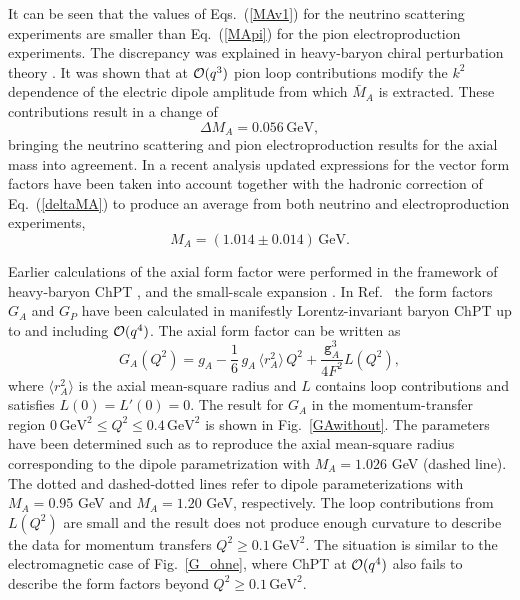 \documentclass[twoside,12pt]{article}
\begin{document}
   It can be seen that the values of Eqs.~(\ref{MAv1})
for the neutrino scattering experiments are smaller than Eq.~(\ref{MApi}) for
the pion electroproduction experiments.
   The discrepancy was explained in heavy-baryon chiral
perturbation theory \cite{Bernard:1992ys}.
   It was shown that at ${\cal O}(q^3)$ pion
loop contributions modify the $k^2$ dependence of the electric dipole amplitude
from which $\bar{M}_A$ is extracted.
   These contributions result in a change of
\begin{equation}\label{deltaMA}
    \Delta M_A = 0.056 \,\mbox{GeV},
\end{equation}
bringing the neutrino scattering and pion electroproduction
results for the axial mass into agreement.
     In a recent analysis \cite{Bodek:2007vi} updated expressions for the vector form
factors have been taken into account together with the hadronic correction
of Eq.~(\ref{deltaMA}) to produce an average from both neutrino and electroproduction
experiments,
\begin{equation}\label{MAv2}
    M_A = (1.014 \pm 0.014)\,\mbox{GeV}.
\end{equation}

  Earlier calculations of the axial form factor were performed in the framework of
heavy-baryon ChPT \cite{Bernard:1992ys}, \cite{Fearing:1997dp} and the small-scale
expansion \cite{Bernard:1998gv}.
   In Ref.\ \cite{Schindler:2006it} the form factors $G_A$ and
$G_P$ have been calculated in manifestly Lorentz-invariant baryon
ChPT up to and including ${\cal O}(q^4)$.
   The axial form factor can be written as
\begin{equation}\label{GAexpansion}
    G_A(Q^2)=g_A-\frac{1}{6}\,g_A\,\langle r^2_A\rangle\, Q^2 +
    \frac{\texttt{g}_A^3}{4F^2}L(Q^2),
\end{equation}
where $\langle r^2_A\rangle$ is the axial mean-square radius
and $L$ contains loop contributions and satisfies $L(0)=L'(0)=0$.
   The result for $G_A$ in the momentum-transfer region
$0\,\mbox{GeV}^2\leq Q^2 \leq 0.4\,\mbox{GeV}^2$
is shown in Fig.~\ref{GAwithout}.
   The parameters have been determined such as to reproduce the axial
mean-square radius corresponding to the dipole parametrization with
$M_A=1.026$ GeV (dashed line).
  The dotted and dashed-dotted lines refer to dipole parameterizations
with $M_A=0.95$ GeV and $M_A=1.20$ GeV, respectively.
   The loop contributions from $L(Q^2)$ are small
and the result does not produce enough curvature to describe the data
for momentum transfers $Q^2 \ge 0.1\, \mbox{GeV}^2$.
   The situation is similar to the electromagnetic case of Fig.~\ref{G_ohne},
where ChPT at ${\cal O}(q^4)$ also fails to
describe the form factors beyond $Q^2 \ge 0.1\, \mbox{GeV}^2$.
\end{document}
